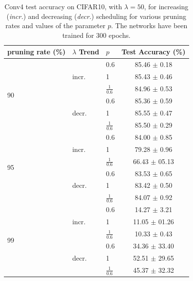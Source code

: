 \begin{table}[htbp]
    \centering
    \begin{tabular}{lllc}
        \toprule
         \textbf{pruning rate} (\%) & \textbf{$\lambda$ Trend} & $p$ & \textbf{Test Accuracy} (\%)\\
        \midrule
         \multirow{6}{*}{90} & \multirow{3}{*}{incr.} & 0.6 & 85.46 $\pm$ 0.18 \\
          & & 1 & 85.43 $\pm$ 0.46 \\
          & & $\frac{1}{0.6}$ & 84.96 $\pm$ 0.53 \\
          \cline{2-4}
          & \multirow{3}{*}{decr.} & 0.6 & 85.36 $\pm$ 0.59 \\
          & & 1 & 85.55 $\pm$ 0.47 \\
          & & $\frac{1}{0.6}$ & 85.50 $\pm$ 0.29 \\
          \midrule
          \multirow{6}{*}{95} & \multirow{3}{*}{incr.} & 0.6 & 84.00 $\pm$ 0.85 \\
          & & 1 & 79.28 $\pm$ 0.96 \\
          & & $\frac{1}{0.6}$ & 66.43 $\pm$ 05.13 \\
          \cline{2-4}
          & \multirow{3}{*}{decr.} & 0.6 & 83.53 $\pm$ 0.65 \\
          & & 1 & 83.42 $\pm$ 0.50 \\
          & & $\frac{1}{0.6}$ & 84.07 $\pm$ 0.92 \\
          \midrule
          \multirow{6}{*}{99} & \multirow{3}{*}{incr.} & 0.6 & 14.27 $\pm$ 3.21 \\
          & & 1 & 11.05 $\pm$ 01.26 \\
          & & $\frac{1}{0.6}$ & 10.33 $\pm$ 0.43 \\
          \cline{2-4}
          & \multirow{3}{*}{decr.} & 0.6 & 34.36 $\pm$ 33.40 \\
          & & 1 & 52.51 $\pm$ 29.65 \\
          & & $\frac{1}{0.6}$ & 45.37 $\pm$ 32.32 \\
        \bottomrule
    \end{tabular}
    \caption{Conv4 test accuracy on CIFAR10, with $\lambda=50$, for increasing
    (\emph{incr.}) and decreasing (\emph{decr.}) scheduling for various pruning
    rates and values of the parameter $p$. The networks have been trained for
    300 epochs.}
    \label{sec:appendix:annihiliation_table}
\end{table}


